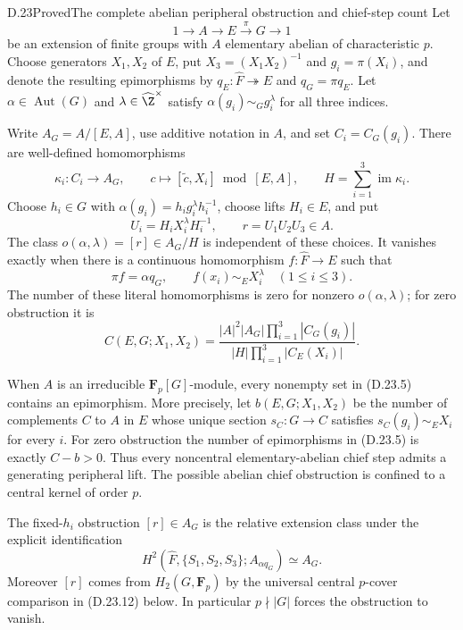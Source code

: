 \begin{statement}{D.23}{Proved}{The complete abelian peripheral obstruction and chief-step count}
Let
\[
 1\longrightarrow A\longrightarrow E\xrightarrow{\pi}G
 \longrightarrow1
 \tag{D.23.2}
\]
be an extension of finite groups with $A$ elementary abelian of
characteristic $p$.  Choose generators $X_1,X_2$ of $E$, put
$X_3=(X_1X_2)^{-1}$ and $g_i=\pi(X_i)$, and denote the resulting
epimorphisms by $q_E:\widehat F\twoheadrightarrow E$ and
$q_G=\pi q_E$.  Let $\alpha\in\operatorname{Aut}(G)$ and
$\lambda\in\widehat\Z^\times$ satisfy
$\alpha(g_i)\sim_G g_i^\lambda$ for all three indices.

Write $A_G=A/[E,A]$, use additive notation in $A$, and set
$C_i=C_G(g_i)$.  There are well-defined homomorphisms
\[
 \kappa_i:C_i\longrightarrow A_G,
 \qquad c\longmapsto[\widetilde c,X_i]\bmod[E,A],
 \qquad H=\sum_{i=1}^3\operatorname{im}\kappa_i.
 \tag{D.23.3}
\]
Choose $h_i\in G$ with
$\alpha(g_i)=h_i g_i^\lambda h_i^{-1}$, choose lifts
$H_i\in E$, and put
\[
 U_i=H_iX_i^\lambda H_i^{-1},\qquad r=U_1U_2U_3\in A.
 \tag{D.23.4}
\]
The class $o(\alpha,\lambda)=[r]\in A_G/H$ is independent of
these choices.  It vanishes exactly when there is a continuous
homomorphism $f:\widehat F\to E$ such that
\[
 \pi f=\alpha q_G,
 \qquad f(x_i)\sim_E X_i^\lambda\quad(1\leq i\leq3).
 \tag{D.23.5}
\]
The number of these literal homomorphisms is zero for nonzero
$o(\alpha,\lambda)$; for zero obstruction it is
\[
 C(E,G;X_1,X_2)=
 \frac{|A|^2|A_G|\prod_{i=1}^3|C_G(g_i)|}
 {|H|\prod_{i=1}^3|C_E(X_i)|}.
 \tag{D.23.6}
\]

When $A$ is an irreducible $\mathbf F_p[G]$-module, every nonempty
set in \textup{(D.23.5)} contains an epimorphism.  More precisely, let
$b(E,G;X_1,X_2)$ be the number of complements $C$ to $A$ in $E$
whose unique section $s_C:G\to C$ satisfies
$s_C(g_i)\sim_E X_i$ for every $i$.  For zero obstruction the number
of epimorphisms in \textup{(D.23.5)} is exactly $C-b>0$.
Thus every noncentral elementary-abelian chief step admits a
generating peripheral lift.  The possible abelian chief obstruction
is confined to a central kernel of order $p$.

The fixed-$h_i$ obstruction $[r]\in A_G$ is the relative extension
class under the explicit identification
\[
 H^2(\widehat F,\{S_1,S_2,S_3\};A_{\alpha q_G})
 \simeq A_G.
 \tag{D.23.7}
\]
Moreover $[r]$ comes from $H_2(G,\mathbf F_p)$ by the universal
central $p$-cover comparison in \textup{(D.23.12)} below.  In
particular $p\nmid|G|$ forces the obstruction to vanish.
\end{statement}

